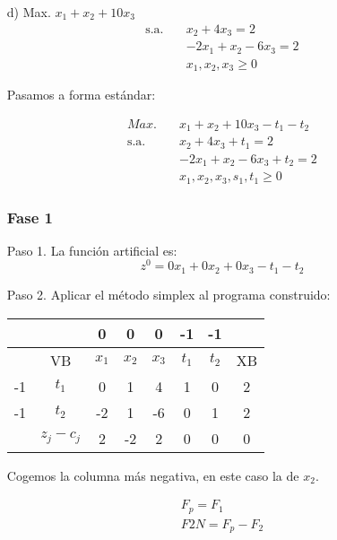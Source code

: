 \begin{itemize}
    
    \item[d)] Max. $x_1 + x_2 + 10x_3$
    \begin{align*}
        \text{s.a.} \quad & x_2 + 4x_3 = 2 \\
        & -2x_1 + x_2 - 6x_3 = 2 \\
        & x_1, x_2, x_3 \geq 0
    \end{align*}

    Pasamos a forma estándar:

    \begin{align*}
        Max. \quad & x_1 + x_2 + 10x_3 - t_1 -t_2\\
        \text{s.a.} \quad & x_2 + 4x_3 + t_1= 2 \\
        & -2x_1 + x_2 - 6x_3 + t_2 = 2 \\
        & x_1, x_2, x_3, s_1, t_1 \geq 0
    \end{align*}

    \subsubsection*{Fase 1}

    Paso 1. La función artificial es: 
    \begin{equation*}
        z^0=0x_1 + 0x_2 + 0x_3  -t_1 -t_2
    \end{equation*}

    Paso 2. Aplicar el método simplex al programa construido:

    \begin{table}[H]
        \centering
        \begin{tabular}{|c|c|c|c|c|c|c|c|}
        \hline
        &  & 0 & 0 & 0 & -1 & -1 &\\
        \hline
        & VB & $x_1$ & $x_2$ & $x_3$ & $t_1$ & $t_2$ & XB \\
        \hline
        -1 & $t_1$ & 0 & 1 & 4 & 1 & 0 & 2\\
        \hline
        -1 & $t_2$ & -2 & 1 & -6 & 0& 1 &2\\
        \hline
        & $z_j - c_j$ & 2 & -2& 2 & 0 & 0 &0\\
        \hline
        \end{tabular}
    \end{table}

    Cogemos la columna más negativa, en este caso la de $x_2$.

    \begin{align*}
        F_p = F_1\\
        F2N = F_p - F_2
    \end{align*}


\end{itemize}
